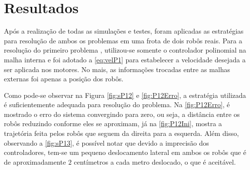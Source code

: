 \chapter{Resultados }
\label{chap:resultados}

Após a realização de todas as simulações e testes, foram aplicadas as estratégias para resolução de ambos os problemas em uma frota de dois robôs reais. Para a resolução do primeiro problema , utilizou-se somente o controlador polinomial na malha interna e foi adotado a \autoref{eq:velP1} para estabelecer a velocidade desejada a ser aplicada nos motores. No mais, as informações trocadas entre as malhas externas foi apenas a posição dos robôs. 

Como pode-se observar na Figura \ref{fig:sP12} e \ref{fig:P12Erro}, a estratégia utilizada é suficientemente adequada para resolução do problema. Na \autoref{fig:P12Erro}, é mostrado o erro do sistema convergindo para zero, ou seja, a distância entre os robôs reduzindo conforme eles se aproximam, já na \autoref{fig:P12Ini}, mostra a trajetória feita pelos robôs que seguem da direita para a esquerda. Além disso, observando a \autoref{fig:sP13}, é possível notar que devido a imprecisão dos controladores, tem-se um pequeno deslocamento lateral em ambos os robôs que é de aproximadamente $2$ centímetros a cada metro deslocado, o que é aceitável.

